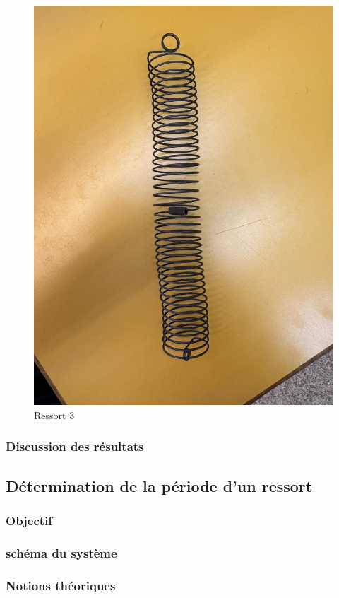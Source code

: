 \begin{figure}[h]
\begin{minipage}{0.32\textwidth}
                    \includegraphics[width=\linewidth]{images/res3.jpeg}
                    \caption{Ressort 3}
                \end{minipage}
            \end{figure}
        \subsubsection{Discussion des résultats}
    \subsection{Détermination de la période d'un ressort}
        \subsubsection{Objectif}
        
        \subsubsection{schéma du système}

        \subsubsection{Notions théoriques}
            
                    
    


    
    
        
